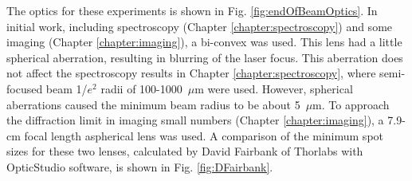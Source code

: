 The optics for these experiments is shown in Fig. \ref{fig:endOfBeamOptics}.  In initial work, including spectroscopy (Chapter \ref{chapter:spectroscopy}) and some imaging (Chapter \ref{chapter:imaging}), a bi-convex was used.  This lens had a little spherical aberration, resulting in blurring of the laser focus.  This aberration does not affect the spectroscopy results in Chapter \ref{chapter:spectroscopy}, where semi-focused beam 1/$e^{2}$ radii of 100-1000~$\mu$m were used.  However, spherical aberrations caused the minimum beam radius to be about 5~$\mu$m.  To approach the diffraction limit in imaging small numbers (Chapter \ref{chapter:imaging}), a 7.9-cm focal length aspherical lens was used.  A comparison of the minimum spot sizes for these two lenses, calculated by David Fairbank of Thorlabs with OpticStudio software, is shown in Fig. \ref{fig:DFairbank}.

